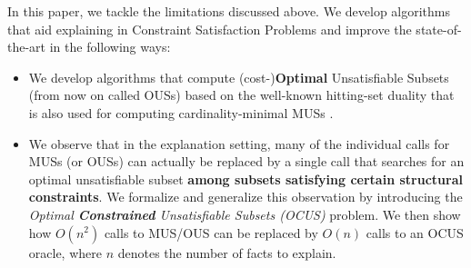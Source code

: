 \documentclass[twoside,11pt]{article}
\newcommand\comment[1]{\marginpar{\tiny #1}}
\renewcommand\comment[1]{#1}
\newcommand{\bart}[1]{{\comment{\color{OliveGreen}Bart: #1}}}
\begin{document}
In this paper, we tackle the limitations discussed above. %
We develop algorithms that aid explaining in Constraint Satisfaction Problems and improve the state-of-the-art in the following ways: 
\begin{itemize}
\item We develop algorithms that compute (cost-)\textbf{Optimal} Unsatisfiable Subsets (from now on called OUSs) based on the well-known hitting-set duality that is also used for computing cardinality-minimal MUSs \cite{ignatiev2015smallest,DBLP:conf/kr/SaikkoWJ16}.

\item We observe that in the explanation setting, many of the individual calls for MUSs (or OUSs) can actually be replaced by a single call that searches for an optimal unsatisfiable subset \textbf{among subsets satisfying certain structural constraints}. 
We formalize and generalize this observation by introducing the \emph{Optimal \textbf{Constrained} Unsatisfiable Subsets (OCUS)} problem. We then show how $O(n^2)$ calls to MUS/OUS can be replaced by $O(n)$ calls to an OCUS oracle, where $n$ denotes the number of facts to explain. 


\end{itemize}
\end{document}
